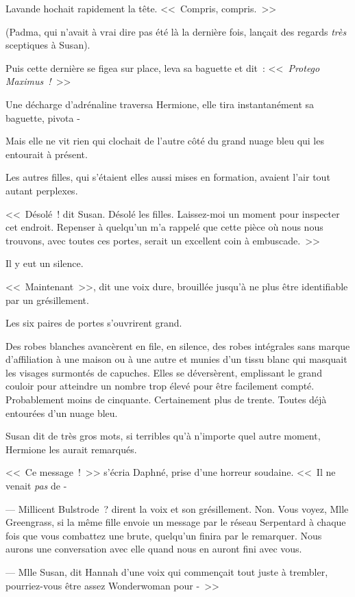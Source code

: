 Lavande hochait rapidement la tête. <<~Compris, compris.~>>

(Padma, qui n'avait à vrai dire pas été là la dernière fois, lançait des regards \emph{très} sceptiques à Susan).

Puis cette dernière se figea sur place, leva sa baguette et dit~: <<~\emph{Protego Maximus~!}~>>

Une décharge d'adrénaline traversa Hermione, elle tira instantanément sa baguette, pivota -

Mais elle ne vit rien qui clochait de l'autre côté du grand nuage bleu qui les entourait à présent.

Les autres filles, qui s'étaient elles aussi mises en formation, avaient l'air tout autant perplexes.

<<~Désolé~! dit Susan. Désolé les filles. Laissez-moi un moment pour inspecter cet endroit. Repenser à quelqu'un m'a rappelé que cette pièce où nous nous trouvons, avec toutes ces portes, serait un excellent coin à embuscade.~>>

Il y eut un silence.

<<~Maintenant~>>, dit une voix dure, brouillée jusqu'à ne plus être identifiable par un grésillement.

Les six paires de portes s'ouvrirent grand.

Des robes blanches avancèrent en file, en silence, des robes intégrales sans marque d'affiliation à une maison ou à une autre et munies d'un tissu blanc qui masquait les visages surmontés de capuches. Elles se déversèrent, emplissant le grand couloir pour atteindre un nombre trop élevé pour être facilement compté. Probablement moins de cinquante. Certainement plus de trente. Toutes déjà entourées d'un nuage bleu.

Susan dit de très gros mots, si terribles qu'à n'importe quel autre moment, Hermione les aurait remarqués.

<<~Ce message~!~>> s'écria Daphné, prise d'une horreur soudaine. <<~Il ne venait \emph{pas} de -

--- Millicent Bulstrode~? dirent la voix et son grésillement. Non. Vous voyez, Mlle Greengrass, si la même fille envoie un message par le réseau Serpentard à chaque fois que vous combattez une brute, quelqu'un finira par le remarquer. Nous aurons une conversation avec elle quand nous en auront fini avec vous.

--- Mlle Susan, dit Hannah d'une voix qui commençait tout juste à trembler, pourriez-vous être assez Wonderwoman pour -~>>

